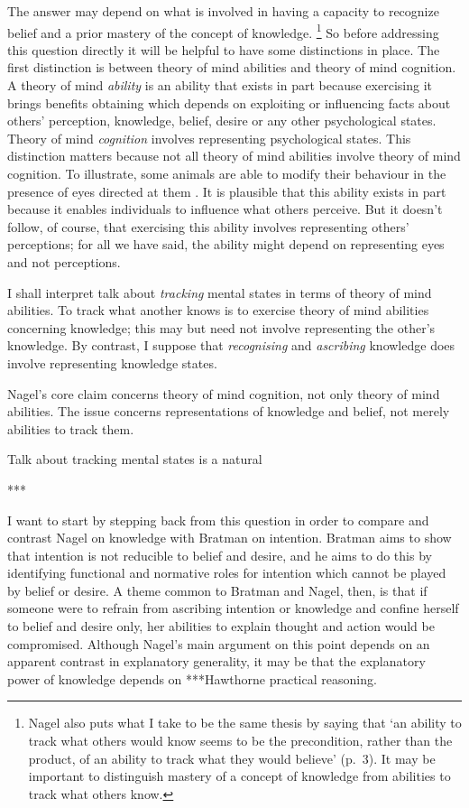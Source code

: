 \documentclass[11pt,a4paper]{extarticle}
\begin{document}
The answer may depend on what is involved in having a capacity  to recognize belief and a prior mastery of the concept of knowledge.%
\footnote{
Nagel also puts what I take to be the same thesis by saying that `an ability to track what others would know seems to be the precondition, rather than the product, of an ability to track what they would believe' (p.\ 3).
It may be important to distinguish mastery of a concept of knowledge from abilities to track what others know.
}
So before addressing this question directly it will be helpful to have some distinctions in place.
The first distinction is between theory of mind abilities and theory of mind cognition.
A theory of mind \textit{ability} is an ability that exists in part because exercising it brings benefits obtaining which depends on exploiting or influencing facts about others’ perception, knowledge, belief, desire or any other psychological states.  
Theory of mind \textit{cognition}  involves representing psychological states.
This distinction matters because not all theory of mind abilities involve theory of mind cognition.
To illustrate, some animals are able to modify their behaviour  in the presence of eyes directed at them \citep[e.g.][]{ernest-jones_effects_2011}.
It is plausible that this ability exists in part because it enables individuals to influence what others perceive.
But it doesn't follow, of course, that exercising this ability involves representing others' perceptions; for all we have said, the ability might depend on representing eyes and not perceptions.  



I shall interpret talk about \textit{tracking} mental states in terms of theory of mind abilities.
To track what another knows is to exercise theory of mind abilities concerning knowledge; this may but need not involve representing the other's knowledge.
By contrast, I suppose that \textit{recognising} and \textit{ascribing} knowledge does involve representing knowledge states.




Nagel's core claim concerns theory of mind cognition, not only theory of mind abilities. 
The issue concerns representations of knowledge and belief, not merely abilities to track them.%




Talk about tracking mental states is a natural 

***

I want to start by stepping back from this question in order to compare and contrast Nagel on knowledge with Bratman on intention.
Bratman aims to show that intention is not reducible to belief and desire,
and he aims to do this by identifying functional and normative roles for intention which cannot be played by belief or desire.
A theme  common to Bratman and Nagel, then, is that if someone were to refrain from ascribing intention or knowledge and confine herself to belief and desire only, her abilities to explain thought and action would be compromised.
Although Nagel's main argument on this point depends on an apparent contrast in explanatory generality, it may be that the explanatory power of knowledge depends on ***Hawthorne practical reasoning.
\end{document}
